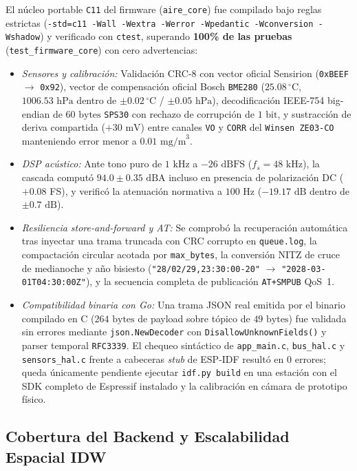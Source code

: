 \documentclass[conference]{IEEEtran}
\begin{document}
El núcleo portable \texttt{C11} del firmware (\texttt{aire\_core}) fue compilado bajo reglas estrictas (\texttt{-std=c11 -Wall -Wextra -Werror -Wpedantic -Wconversion -Wshadow}) y verificado con \texttt{ctest}, superando \textbf{100\% de las pruebas} (\texttt{test\_firmware\_core}) con cero advertencias:
\begin{itemize}
    \item \emph{Sensores y calibración:} Validación CRC-8 con vector oficial Sensirion (\texttt{0xBEEF} $\to$ \texttt{0x92}), vector de compensación oficial Bosch \texttt{BME280} ($25.08\,^\circ\text{C}$, $1006.53\text{ hPa}$ dentro de $\pm 0.02\,^\circ\text{C}$ / $\pm 0.05\text{ hPa}$), decodificación IEEE-754 big-endian de $60\text{ bytes}$ \texttt{SPS30} con rechazo de corrupción de $1\text{ bit}$, y sustracción de deriva compartida ($+30\text{ mV}$) entre canales \texttt{VO} y \texttt{CORR} del \texttt{Winsen ZE03-CO} manteniendo error menor a $0.01\text{ mg/m}^3$.
    \item \emph{DSP acústico:} Ante tono puro de $1\text{ kHz}$ a $-26\text{ dBFS}$ ($f_s=48\text{ kHz}$), la cascada computó $94.0 \pm 0.35\text{ dBA}$ incluso en presencia de polarización DC ($+0.08$ FS), y verificó la atenuación normativa a $100\text{ Hz}$ ($-19.17\text{ dB}$ dentro de $\pm 0.7\text{ dB}$).
    \item \emph{Resiliencia store-and-forward y AT:} Se comprobó la recuperación automática tras inyectar una trama truncada con CRC corrupto en \texttt{queue.log}, la compactación circular acotada por \texttt{max\_bytes}, la conversión NITZ de cruce de medianoche y año bisiesto (\texttt{"28/02/29,23:30:00-20"} $\to$ \texttt{"2028-03-01T04:30:00Z"}), y la secuencia completa de publicación \texttt{AT+SMPUB} QoS~1.
    \item \emph{Compatibilidad binaria con Go:} Una trama JSON real emitida por el binario compilado en C ($264\text{ bytes}$ de payload sobre tópico de $49\text{ bytes}$) fue validada sin errores mediante \texttt{json.NewDecoder} con \texttt{DisallowUnknownFields()} y parser temporal \texttt{RFC3339}. El chequeo sintáctico de \texttt{app\_main.c}, \texttt{bus\_hal.c} y \texttt{sensors\_hal.c} frente a cabeceras \emph{stub} de ESP-IDF resultó en $0$ errores; queda únicamente pendiente ejecutar \texttt{idf.py build} en una estación con el SDK completo de Espressif instalado y la calibración en cámara de prototipo físico.
\end{itemize}

\subsection{Cobertura del Backend y Escalabilidad Espacial IDW}
\end{document}
